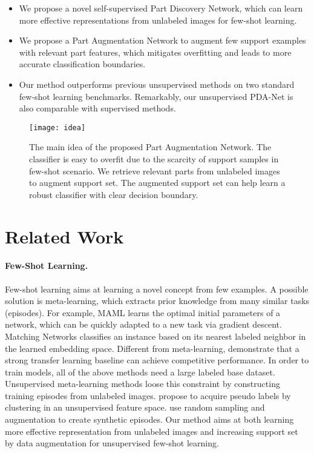 \documentclass{article}
\begin{document}
\begin{itemize}
    \item We propose a novel self-supervised Part Discovery Network, which can learn more effective representations from unlabeled images for few-shot learning.
    \item We propose a Part Augmentation Network to augment few support examples with relevant part features, which mitigates overfitting and leads to more accurate classification boundaries.
    \item Our method outperforms previous unsupervised methods on two standard few-shot learning benchmarks. Remarkably, our unsupervised PDA-Net is also comparable with supervised methods.
\end{itemize}





\begin{figure}
    \centering
    \texttt{[image: idea]}
    \caption{The main idea of the proposed Part Augmentation Network. The classifier is easy to overfit due to the scarcity of support samples in few-shot scenario. We retrieve relevant parts from unlabeled images to augment support set. The augmented support set can help learn a robust classifier with clear decision boundary.} 
    \label{fig:idea}
\end{figure}










\section{Related Work}
\paragraph{Few-Shot Learning.} Few-shot learning aims at learning a novel concept from few examples. A possible solution is meta-learning, which extracts prior knowledge from many similar tasks (episodes). For example, MAML \cite{pmlr-v70-finn17a} learns the optimal initial parameters of a network, which can be quickly adapted to a new task via gradient descent. Matching Networks \cite{vinyals2016matching} classifies an instance based on its nearest labeled neighbor in the learned embedding space. Different from meta-learning, \cite{Dhillon2020A} demonstrate that a strong transfer learning baseline can achieve competitive performance.
In order to train models, all of the above methods need a large labeled base dataset. Unsupervised  meta-learning  methods loose  this constraint by constructing training episodes from unlabeled images. \cite{hsu2018unsupervised} propose to acquire pseudo labels by clustering in an unsupervised feature space. \cite{khodadadeh2019unsupervised} use random sampling and augmentation to create synthetic episodes. Our method aims at both learning more effective representation from unlabeled images and increasing support set by data augmentation for unsupervised few-shot learning.
\end{document}
